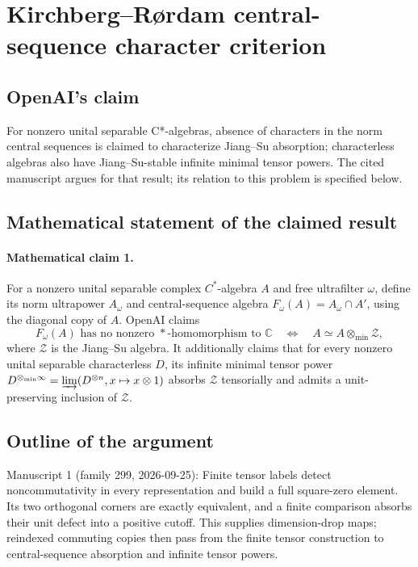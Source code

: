 \documentclass[11pt]{article}
\begin{document}
\section*{Kirchberg–Rørdam central-sequence character criterion}

\subsection{OpenAI's claim}
For nonzero unital separable C*-algebras, absence of characters in the norm central sequences is claimed to characterize Jiang--Su absorption; characterless algebras also have Jiang--Su-stable infinite minimal tensor powers. The cited manuscript argues for that result; its relation to this problem is specified below.

\subsection{Mathematical statement of the claimed result}
\paragraph{Mathematical claim 1.} For a nonzero unital separable complex $C^*$-algebra $A$ and free ultrafilter $\omega$, define its norm ultrapower $A_\omega$ and central-sequence algebra $F_\omega(A)=A_\omega\cap A'$, using the diagonal copy of $A$. OpenAI claims
\[
F_\omega(A)\text{ has no nonzero }*\text{-homomorphism to }\mathbb C
\quad\Longleftrightarrow\quad A\simeq A\otimes_{\min}\mathcal Z,
\]
where $\mathcal Z$ is the Jiang--Su algebra. It additionally claims that for every nonzero unital separable characterless $D$, its infinite minimal tensor power $D^{\otimes_{\min}\infty}=\varinjlim(D^{\otimes n},x\mapsto x\otimes1)$ absorbs $\mathcal Z$ tensorially and admits a unit-preserving inclusion of $\mathcal Z$.

\subsection{Outline of the argument}
Manuscript 1 (family 299, 2026-09-25): Finite tensor labels detect noncommutativity in every representation and build a full square-zero element. Its two orthogonal corners are exactly equivalent, and a finite comparison absorbs their unit defect into a positive cutoff. This supplies dimension-drop maps; reindexed commuting copies then pass from the finite tensor construction to central-sequence absorption and infinite tensor powers.
\end{document}
